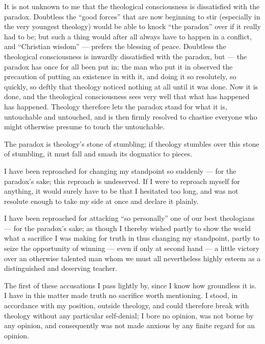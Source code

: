 \documentclass[12pt,a4paper]{book}
\begin{document}
It is not unknown to me that the theological consciousness is dissatisfied with the paradox.
Doubtless the ``good forces'' that are now beginning to stir (especially in the very youngest
theology) would be able to knock ``the paradox'' over if it really had to be; but such a thing would
after all always have to happen in a conflict, and ``Christian wisdom'' --- prefers the blessing of
peace. Doubtless the theological consciousness is inwardly dissatisfied with the paradox, but ---
the paradox has once for all been put in; the man who put it in observed the precaution of putting
an existence in with it, and doing it so resolutely, so quickly, so deftly that theology noticed
nothing at all until it was done. Now it is done, and the theological consciousness sees very well
that what has happened has happened. Theology therefore lets the paradox stand for what it is,
untouchable and untouched, and is then firmly resolved to chastise everyone who might otherwise
presume to touch the untouchable.

The paradox is theology's stone of stumbling; if theology stumbles over this stone of stumbling, it
must fall and smash its dogmatics to pieces.

I have been reproached for changing my standpoint so suddenly --- for the paradox's sake; this
reproach is undeserved. If I were to reproach myself for anything, it would surely have to be that I
hesitated too long, and was not resolute enough to take my side at once and declare it plainly.

I have been reproached for attacking ``so personally'' one of our best theologians --- for the
paradox's sake; as though I thereby wished partly to show the world what a sacrifice I was making
for truth in thus changing my standpoint, partly to seize
the opportunity of winning --- even if only at second hand --- a little victory over an otherwise
talented man whom we must all nevertheless highly esteem as a distinguished and deserving teacher.

The first of these accusations I pass lightly by, since I know how groundless it is. I have in this
matter made truth no sacrifice worth mentioning. I stood, in accordance with my position, outside
theology, and could therefore break with theology without any particular self-denial; I bore no
opinion, was not borne by any opinion, and consequently was not made anxious by any finite regard
for an opinion.
\end{document}

